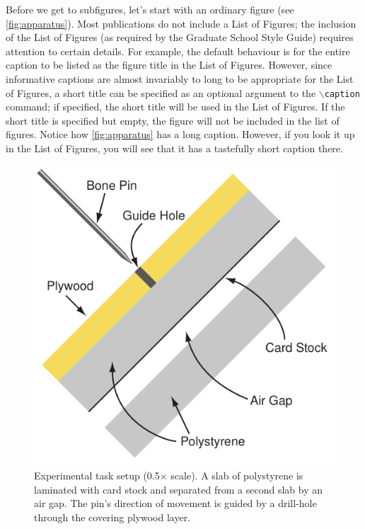 Before we get to subfigures, let's start with an ordinary figure (see \autoref{fig:apparatus}).
Most publications do not include a List of Figures; the inclusion of the List of Figures (as required by the Graduate School Style Guide) requires attention to certain details.
For example, the default behaviour is for the entire caption to be listed as the figure title in the List of Figures.
However, since informative captions are almost invariably to long to be appropriate for the List of Figures, a short title can be specified as an optional argument to the $\backslash$\texttt{caption} command; if specified, the short title will be used in the List of Figures.
If the short title is specified but empty, the figure will not be included in the list of figures.
Notice how \autoref{fig:apparatus} has a long caption.
However, if you look it up in the List of Figures, you will see that it has a tastefully short caption there.

\begin{figure}
\centering %
\includegraphics{figures/Apparatus}%
\caption[Experimental task setup]{%
  Experimental task setup (0.5$\times$ scale).  A slab of polystyrene is laminated with card stock and separated from a second slab by an air gap. The pin's direction of movement is guided by a drill-hole through the covering plywood layer.
}%
\label{fig:apparatus} %
\end{figure}

